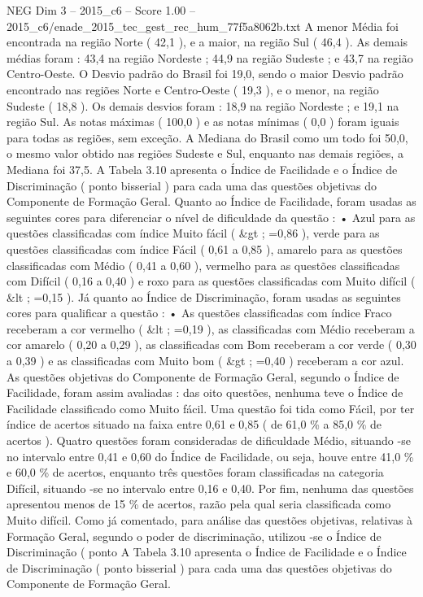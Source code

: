 \begin{textsample}{NEG Dim 3 – 2015\_c6 – Score 1.00 – 2015\_c6/enade\_2015\_tec\_gest\_rec\_hum\_77f5a8062b.txt}
A menor Média foi encontrada na região Norte ( 42,1 ), e a maior, na região Sul ( 46,4 ).
As demais médias foram : 43,4 na região Nordeste ; 44,9 na região Sudeste ; e 43,7 na região Centro-Oeste.
O Desvio padrão do Brasil foi 19,0, sendo o maior Desvio padrão encontrado nas regiões Norte e Centro-Oeste ( 19,3 ), e o menor, na região Sudeste ( 18,8 ).
Os demais desvios foram : 18,9 na região Nordeste ; e 19,1 na região Sul.
As notas máximas ( 100,0 ) e as notas mínimas ( 0,0 ) foram iguais para todas as regiões, sem exceção.
A Mediana do Brasil como um todo foi 50,0, o mesmo valor obtido nas regiões Sudeste e Sul, enquanto nas demais regiões, a Mediana foi 37,5.
A Tabela 3.10 apresenta o Índice de Facilidade e o Índice de Discriminação ( ponto bisserial ) para cada uma das questões objetivas do Componente de Formação Geral.
Quanto ao Índice de Facilidade, foram usadas as seguintes cores para diferenciar o nível de dificuldade da questão : • Azul para as questões classificadas com índice Muito fácil ( \&gt ; =0,86 ), verde para as questões classificadas com índice Fácil ( 0,61 a 0,85 ), amarelo para as questões classificadas com Médio ( 0,41 a 0,60 ), vermelho para as questões classificadas com Difícil ( 0,16 a 0,40 ) e roxo para as questões classificadas com Muito difícil ( \&lt ; =0,15 ).
Já quanto ao Índice de Discriminação, foram usadas as seguintes cores para qualificar a questão : • As questões classificadas com índice Fraco receberam a cor vermelho ( \&lt ; =0,19 ), as classificadas com Médio receberam a cor amarelo ( 0,20 a 0,29 ), as classificadas com Bom receberam a cor verde ( 0,30 a 0,39 ) e as classificadas com Muito bom ( \&gt ; =0,40 ) receberam a cor azul.
As questões objetivas do Componente de Formação Geral, segundo o Índice de Facilidade, foram assim avaliadas : das oito questões, nenhuma teve o Índice de Facilidade classificado como Muito fácil.
Uma questão foi tida como Fácil, por ter índice de acertos situado na faixa entre 0,61 e 0,85 ( de 61,0 \% a 85,0 \% de acertos ).
Quatro questões foram consideradas de dificuldade Médio, situando -se no intervalo entre 0,41 e 0,60 do Índice de Facilidade, ou seja, houve entre 41,0 \% e 60,0 \% de acertos, enquanto três questões foram classificadas na categoria Difícil, situando -se no intervalo entre 0,16 e 0,40.
Por fim, nenhuma das questões apresentou menos de 15 \% de acertos, razão pela qual seria classificada como Muito difícil.
Como já comentado, para análise das questões objetivas, relativas à Formação Geral, segundo o poder de discriminação, utilizou -se o Índice de Discriminação ( ponto A Tabela 3.10 apresenta o Índice de Facilidade e o Índice de Discriminação ( ponto bisserial ) para cada uma das questões objetivas do Componente de Formação Geral.

\end{textsample}
